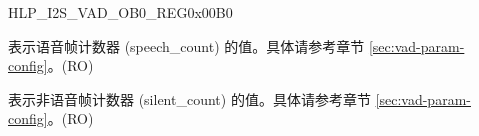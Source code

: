 \begin{register}{H}{LP\_I2S\_VAD\_OB0\_REG}{0x00B0}\label{regdesc:LPI2SVADOB0REG}
%
%
%
\regnewline%
\begin{regdesc}\begin{reglist}
\label{fielddesc:LPI2SSPEECHCOUNTOB}\item [LP\_I2S\_SPEECH\_COUNT\_OB] 表示语音帧计数器 (speech\_count) 的值。具体请参考章节 \ref{sec:vad-param-config}。(RO)
\label{fielddesc:LPI2SSILENTCOUNTOB}\item [LP\_I2S\_SILENT\_COUNT\_OB] 表示非语音帧计数器 (silent\_count) 的值。具体请参考章节 \ref{sec:vad-param-config}。(RO)
\end{reglist}\end{regdesc}
\end{register}

